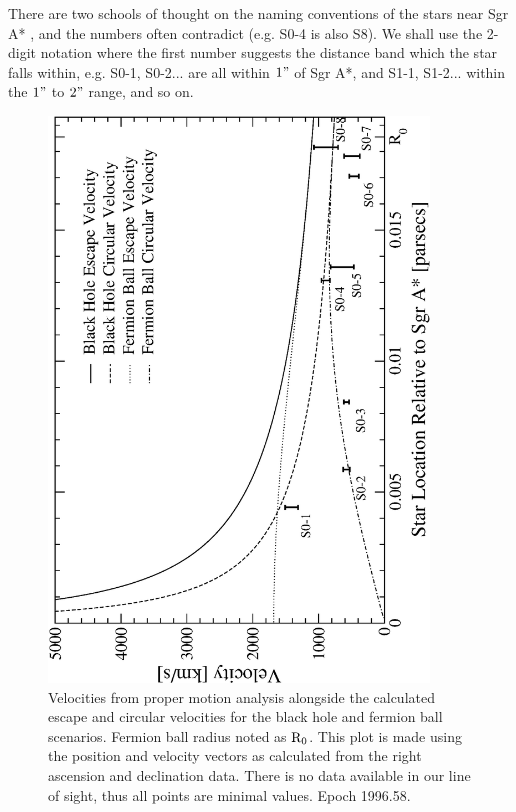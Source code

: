 There are two schools of thought on the naming conventions of the stars near Sgr A* \cite{ref_ghezorbits, ref_eckartorbits}, and the
numbers often contradict (e.g. S0-4 is also S8). We shall use the 2-digit notation where the first number
suggests the distance band which the star falls within, e.g. S0-1, S0-2... are all within $1"$ of Sgr A*, and S1-1, S1-2... within
the $1"$ to $2"$ range, and so on.
\begin{figure}[!tb]
	\begin{center}
	\includegraphics[angle=-90,width=0.9\textwidth]{eps/escapevelocitieswithdata.eps}
	\caption{Velocities from proper motion analysis \cite{ref_ghezmotion} alongside the calculated escape and circular
	velocities for the black hole and fermion ball scenarios. Fermion ball radius noted as ${\rm R_0}$.
	This plot is made using the position and velocity vectors as calculated from the right ascension and declination data. There
	is no data available in our line of sight, thus all points are minimal values. Epoch 1996.58.}
	\label{fig_escapevelocities}
	\end{center}
\end{figure}

